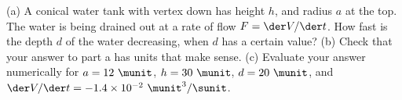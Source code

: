 (a)
A conical water tank with vertex down
has height $h$, and radius $a$ at the top.
The water is being drained out at a rate of flow
$F=\der V/\der t$.
How fast is the depth $d$ of
the water decreasing, when $d$ has a certain value?
(b) Check that your answer to part a has units that
make sense.
(c) Evaluate your answer numerically for $a=12\ \munit$,
$h=30\ \munit$, $d=20\ \munit$, and $\der V/\der t=-1.4\times10^{-2}\ \munit^3/\sunit$.
\answercheck
